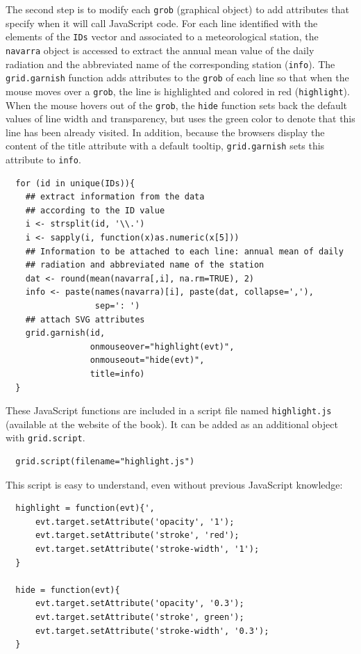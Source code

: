 \documentclass[smallroyalvopaper]{memoir}
\begin{document}
The second step is to modify each \texttt{grob} (graphical object) to add
attributes that specify when it will call JavaScript code. For each
line identified with the elements of the \texttt{IDs} vector and associated
to a meteorological station, the \texttt{navarra} object is accessed to
extract the annual mean value of the daily radiation and the
abbreviated name of the corresponding station (\texttt{info}).  The
\texttt{grid.garnish} function adds attributes to the \texttt{grob} of each line so
that when the mouse moves over a \texttt{grob}, the line is highlighted and
colored in red (\texttt{highlight}). When the mouse hovers out of the \texttt{grob},
the \texttt{hide} function sets back the default values of line width and
transparency, but uses the green color to denote that this line has
been already visited. In addition, because the browsers display the
content of the title attribute with a default tooltip, \texttt{grid.garnish}
sets this attribute to \texttt{info}.


\lstset{language=r,label= ,caption= ,captionpos=b,numbers=none}
\begin{lstlisting}
  for (id in unique(IDs)){
    ## extract information from the data
    ## according to the ID value
    i <- strsplit(id, '\\.')
    i <- sapply(i, function(x)as.numeric(x[5]))
    ## Information to be attached to each line: annual mean of daily
    ## radiation and abbreviated name of the station
    dat <- round(mean(navarra[,i], na.rm=TRUE), 2)
    info <- paste(names(navarra)[i], paste(dat, collapse=','),
                  sep=': ')
    ## attach SVG attributes
    grid.garnish(id,
                 onmouseover="highlight(evt)",
                 onmouseout="hide(evt)",
                 title=info)
  }
\end{lstlisting}

These JavaScript functions are included in a script file named
\texttt{highlight.js} (available at the website of the book). It can be
added as an additional object with \texttt{grid.script}.


\lstset{language=r,label= ,caption= ,captionpos=b,numbers=none}
\begin{lstlisting}
  grid.script(filename="highlight.js")
\end{lstlisting}

This script is easy to understand, even without previous
JavaScript knowledge:
\begin{verbatim}
  highlight = function(evt){',
      evt.target.setAttribute('opacity', '1');
      evt.target.setAttribute('stroke', 'red');
      evt.target.setAttribute('stroke-width', '1');
  }
  
  hide = function(evt){
      evt.target.setAttribute('opacity', '0.3');
      evt.target.setAttribute('stroke', green');
      evt.target.setAttribute('stroke-width', '0.3');
  }
\end{verbatim}
\end{document}
